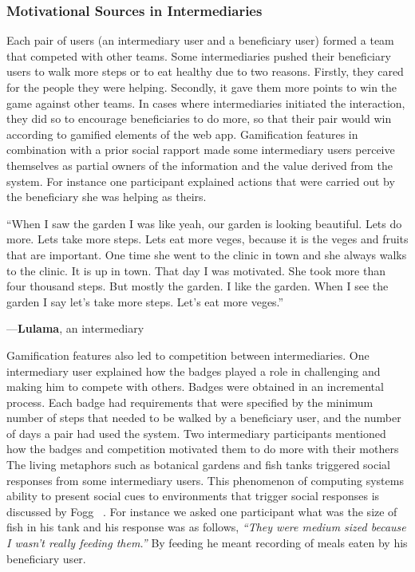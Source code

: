 \documentclass{sig-alternate}
\newenvironment{myquote}
               {\list{}{\rightmargin   \leftmargin
                        \parsep        0in }%
                \item\relax}
               {\endlist}
\newcommand{\userquote}[2]{\begin{samepage}\begin{myquote} 
     \em{\small{#2\begin{flushright}---#1\end{flushright}}}
   \end{myquote}\end{samepage}}
\begin{document}
\subsubsection*{\textbf{Motivational Sources in Intermediaries}} 

Each pair of users (an intermediary user and a beneficiary user) formed a team
that competed with other teams.  Some intermediaries pushed their beneficiary
users to walk more steps or to eat healthy due to two reasons. Firstly,
they cared for the people they were helping. Secondly, it gave
them more points to win the game against other teams. In cases where
intermediaries initiated the interaction, they did so to encourage
beneficiaries to do more, so that their pair would win according to
gamified elements of the web app.
Gamification features in combination with a prior social rapport made some
intermediary users perceive themselves as partial owners of the information
and the value derived from the system. For instance one participant explained
actions that were carried out by the beneficiary she was helping as theirs.

\userquote{\textbf{Lulama}, an intermediary} {``When I saw the garden I was 
like yeah, our garden is looking beautiful. Lets do more. Lets take more steps. 
Lets eat more veges, because it is the veges and fruits that are important. 
One time she 
went to the clinic in town and she always walks to the clinic. It is up in 
town. That day I was motivated. She took more than four thousand steps. But 
mostly the garden. I like the garden. When I see the garden I say let's take 
more steps. Let's eat more veges.''}

Gamification features also led to competition between intermediaries. One
intermediary user explained how the badges played a role in challenging and
making him to compete with others. Badges were obtained in an incremental
process. Each badge had requirements that were specified by the minimum 
number of steps that needed to be walked by a beneficiary user, and the 
number of days a pair had used the system. Two intermediary participants mentioned how
the badges and competition motivated them to do more with their mothers 
The living metaphors such as botanical gardens and fish tanks triggered
social responses from some intermediary users. This phenomenon of computing
systems ability to present social cues to environments that trigger social
responses is discussed by Fogg ~\cite{foggpersuasivebook}. For instance we
asked one participant what was the size of fish in his tank and his response
was as follows, \textit{``They were medium sized because I wasn't really
feeding them.''} By feeding he meant recording of meals eaten by his
beneficiary user.
\end{document}
